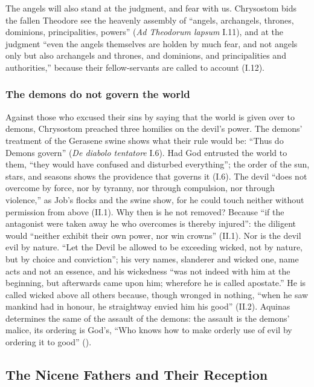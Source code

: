 The angels will also stand at the judgment, and fear with us. Chrysostom
bids the fallen Theodore see the heavenly assembly of ``angels,
archangels, thrones, dominions, principalities, powers'' (\emph{Ad
Theodorum lapsum} I.11), and at the judgment ``even the angels themselves
are holden by much fear, and not angels only but also archangels and
thrones, and dominions, and principalities and authorities,'' because
their fellow-servants are called to account (I.12).

\subsubsection{The demons do not govern the world}

Against those who excused their sins by saying that the world is given
over to demons, Chrysostom preached three homilies on the devil's power.
The demons' treatment of the Gerasene swine shows what their rule would
be: ``Thus do Demons govern'' (\emph{De diabolo tentatore} I.6). Had God
entrusted the world to them, ``they would have confused and disturbed
everything''; the order of the sun, stars, and seasons shows the
providence that governs it (I.6). The devil ``does not overcome by force,
nor by tyranny, nor through compulsion, nor through violence,'' as Job's
flocks and the swine show, for he could touch neither without permission
from above (II.1). Why then is he not removed? Because ``if the
antagonist were taken away he who overcomes is thereby injured'': the
diligent would ``neither exhibit their own power, nor win crowns'' (II.1).
Nor is the devil evil by nature. ``Let the Devil be allowed to be exceeding
wicked, not by nature, but by choice and conviction''; his very names,
slanderer and wicked one, name acts and not an essence, and his wickedness
``was not indeed with him at the beginning, but afterwards came upon him;
wherefore he is called apostate.'' He is called wicked above all others
because, though wronged in nothing, ``when he saw mankind had in honour,
he straightway envied him his good'' (II.2).
Aquinas determines the same of the assault of the demons: the
assault is the demons' malice, its ordering is God's, ``Who knows how to
make orderly use of evil by ordering it to good'' ().

\sectionguard
\subsection{The Nicene Fathers and Their Reception}\label{sec:fb-nicene-reception}


